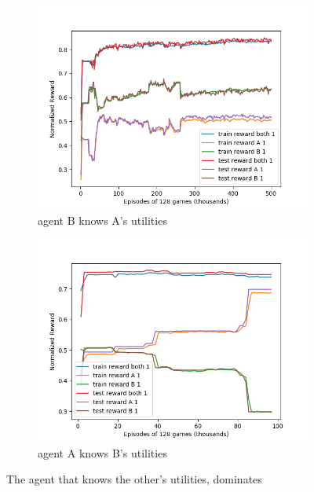 \documentclass{article}
\begin{document}
\begin{figure}[h]
    \centering
    \begin{subfigure}{.5\textwidth}
    \begin{center}
        \includegraphics[width=0.9\linewidth]{opp-util-0.png}
    \end{center}
    \caption{agent B knows A's utilities}
    \end{subfigure}%
    \begin{subfigure}{.5\textwidth}
    \begin{center}
        \includegraphics[width=0.9\linewidth]{opp-util-1.png}
    \end{center}
    \caption{agent A knows B's utilities}
    \end{subfigure}
    \label{fig:self-opp-util}
    \caption{The agent that knows the other's utilities, dominates}
\end{figure}
\end{document}
